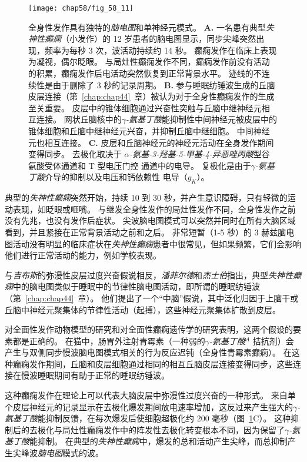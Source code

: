 \begin{figure}[htbp]
	\centering
	\texttt{[image: chap58/fig\_58\_11]}
	\caption{全身性发作具有独特的\textit{脑电图}和单神经元模式。
		\textbf{A.} 一名患有典型\textit{失神性癫痫}（小发作）的 12 岁患者的脑电图显示，同步尖峰突然出现，频率为每秒 3 次，波活动持续约 14 秒。
		癫痫发作在临床上表现为凝视，偶尔眨眼。
		与局灶性癫痫发作不同，癫痫发作前没有活动的积累，癫痫发作后电活动突然恢复到正常背景水平。
		迹线的不连续性是由于删除了 3 秒的记录周期\cite{lothman1990seizures}。
		\textbf{B.} 参与睡眠纺锤波生成的丘脑皮层连接（第~\ref{chap:chap44}~章）被认为对于全身性癫痫发作的生成至关重要。
		皮层中的锥体细胞通过兴奋性突触与丘脑中继神经元相互连接。
		网状丘脑核中的\textit{$\gamma$-氨基丁酸}能抑制性中间神经元被皮层中的锥体细胞和丘脑中继神经元兴奋，并抑制丘脑中继细胞。
		中间神经元也相互连接。 
		\textbf{C.} 皮层和丘脑神经元的神经元活动在全身发作期间变得同步。
		去极化取决于 \textit{$\alpha$-氨基-3-羟基-5-甲基-4-异恶唑丙酸}型谷氨酸受体通道和 T 型电压门控  通道中的电导。
		复极化是由于\textit{$\gamma$-氨基丁酸}介导的抑制以及电压和钙依赖性  电导（$ g_K $）\cite{lothman1993neurobiology}。}
	\label{fig:58_11}
\end{figure}


典型的\textit{失神性癫痫}突然开始，持续 10 到 30 秒，并产生意识障碍，只有轻微的运动表现，如眨眼或咂嘴。
与继发全身性发作的局灶性发作不同，全身性发作之前没有先兆，也没有发作后症状。
尖波脑电图模式可以突然并同时在所有大脑区域看到，并且紧接在正常背景活动之前和之后。
非常短暂（1-5 秒）的 3 赫兹脑电图活动没有明显的临床症状在\textit{失神性癫痫}患者中很常见，但如果频繁，它们会影响他们进行正常活动的能力，例如学校表现。


与\textit{吉布斯}的弥漫性皮层过度兴奋假说相反，\textit{潘菲尔德}和\textit{杰士伯}指出，典型\textit{失神性癫痫}中的脑电图类似于睡眠中的节律性脑电图活动，即所谓的睡眠纺锤波（第~\ref{chap:chap44}~章）。
他们提出了一个“中脑”假说，其中泛化归因于上脑干或丘脑中神经元聚集体的节律性活动（起搏），这些神经元聚集体扩散到皮层。


对全面性发作动物模型的研究和对全面性癫痫遗传学的研究表明，这两个假设的要素都是正确的。
在猫中，肠胃外注射青霉素（一种弱的\textit{$\gamma$-氨基丁酸}$^A$ 拮抗剂）会产生与双侧同步慢波脑电图模式相关的行为反应迟钝（全身性青霉素癫痫）。
在这种癫痫发作期间，丘脑和皮层细胞通过相同的相互丘脑皮层连接变得同步，这些连接在慢波睡眠期间有助于正常的睡眠纺锤波。


这种癫痫发作在理论上可以代表大脑皮层中弥漫性过度兴奋的一种形式。
来自单个皮层神经元的记录显示在去极化爆发期间放电速率增加，这反过来产生强大的\textit{$\gamma$-氨基丁酸}能抑制反馈，在每次爆发后使细胞超极化约 200 毫秒（图~\ref{fig:58_11}C）。
这种抑制后的去极化与局灶性癫痫发作中的阵发性去极化转变根本不同，因为保留了\textit{$\gamma$-氨基丁酸}能抑制。
在典型的\textit{失神性癫痫}中，爆发的总和活动产生尖峰，而总抑制产生尖峰波\textit{脑电图}模式的波。


